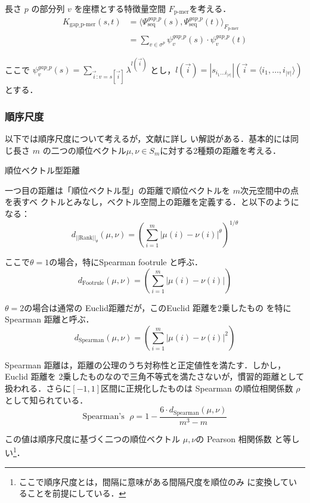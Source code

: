 \documentclass[japanese]{jnlp_1.4}
\renewcommand{\paragraph}{}
\newcommand{\modified}[1]{}
\begin{document}
長さ $p$ の部分列 $v$ を座標とする特徴量空間 $F_{\mbox{p-mer}}$を考える．
\begin{align*}
 K_{\mbox{gap\_p-mer}}(s,t)  & =  \langle \Psi^{gap\_p}_{\mbox{seq}} (s), \Psi^{gap\_p}_{\mbox{seq}} (t) \rangle_{F_{\mbox{p-mer}}} \\
 & = \sum_{v \in \sigma^{p}} \psi^{gap\_p}_{v}(s) \cdot \psi^{gap\_p}_{v}(t)
\end{align*}

ここで $\psi^{gap\_p}_{v}(s) = \sum_{\vec{i}:v=s[\vec{i}]} \lambda^{l(\vec{i})}$ とし，$l(\vec{i})=|s_{i_{1} \ldots i_{|v|}}| (\vec{i} = \langle i_{1}, \ldots, i_{|v|} \rangle)$ とする．


\subsubsection{順序尺度}

以下では順序尺度について考えるが，文献\cite{kamishima-2009-JSAI-sig-dmsm}に詳し
い解説がある．基本的には同じ長さ $m$ の二つの順位ベクトル$\mu,\nu \in S_{m}$に対する2種類の距離を考える．

\paragraph{順位ベクトル型距離}
\label{para:rankvec}

一つ目の距離は「順位ベクトル型」の距離で順位ベクトルを $m$次元空間中の点を表すベ
クトルとみなし，ベクトル空間上の距離を定義する．\modified{ベクトル空間上の$\theta$-ノルム
を用いる}と以下のようになる：
\[
d_{||\mbox{Rank}||_{\theta}}(\mu,\nu) = (\sum^{m}_{i=1} | \mu(i) - \nu(i)|^{\theta})^{1/\theta}
\]


ここで$\theta = 1$の場合，特にSpearman footrule と呼ぶ．
\[
d_{\mbox{Footrule}}(\mu,\nu) = (\sum^{m}_{i=1} | \mu(i) - \nu(i)|)
\]

$\theta = 2$の場合は通常の Euclid距離だが，このEuclid 距離を2乗したもの 
  を特に Spearman 距離と呼ぶ．
\[
d_{\mbox{Spearman}}(\mu,\nu) = (\sum^{m}_{i=1} | \mu(i) - \nu(i)|^{2})
\]

Spearman 距離は，距離の公理のうち対称性と正定値性を満たす．しかし，Euclid 距離を
2乗したものなので三角不等式を満たさないが，慣習的\modified{に}距離として扱われる．さらに$[-1, 1]$区間に正規化したものは Spearman の順位相関係数 $\rho$ として知られている．
\[
\mbox{Spearman's }\; \rho = 1 - \frac{6 \cdot d_{\mbox{Spearman}}(\mu,\nu)}{m^3-m}
\]

この値は順序尺度に基づく二つの順位ベクトル $\mu, \nu$の Pearson 相関係数
と等しい\footnote{ここで順序尺度とは，間隔に意味がある間隔尺度を順位のみ
に変換していることを前提にしている．}．
\end{document}

